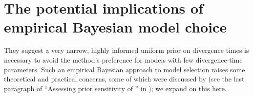 \section{The potential implications of empirical Bayesian model choice}
%
%
%
They suggest a very narrow, highly informed uniform prior on divergence times
is necessary to avoid the method's preference for models with few
divergence-time parameters.
Such an empirical Bayesian approach to model selection raises some theoretical
and practical concerns, some of which were discussed by \citet{Oaks2012} (see
the last paragraph of ``Assessing prior sensitivity of \msb'' in
\citet{Oaks2012}); we expand on this here.

